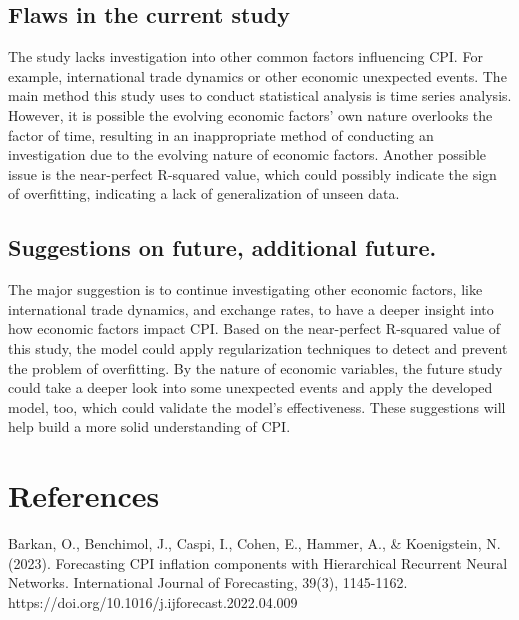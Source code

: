 \documentclass[
  man,floatsintext,
  man]{apa6}
\begin{document}
\hypertarget{flaws-in-the-current-study}{%
\subsection{Flaws in the current study}\label{flaws-in-the-current-study}}

The study lacks investigation into other common factors influencing CPI. For example, international trade dynamics or other economic unexpected events. The main method this study uses to conduct statistical analysis is time series analysis. However, it is possible the evolving economic factors' own nature overlooks the factor of time, resulting in an inappropriate method of conducting an investigation due to the evolving nature of economic factors. Another possible issue is the near-perfect R-squared value, which could possibly indicate the sign of overfitting, indicating a lack of generalization of unseen data.

\hypertarget{suggestions-on-future-additional-future.}{%
\subsection{Suggestions on future, additional future.}\label{suggestions-on-future-additional-future.}}

The major suggestion is to continue investigating other economic factors, like international trade dynamics, and exchange rates, to have a deeper insight into how economic factors impact CPI. Based on the near-perfect R-squared value of this study, the model could apply regularization techniques to detect and prevent the problem of overfitting. By the nature of economic variables, the future study could take a deeper look into some unexpected events and apply the developed model, too, which could validate the model's effectiveness. These suggestions will help build a more solid understanding of CPI.

\newpage

\hypertarget{references}{%
\section{References}\label{references}}

\begin{hangparas}{4em}{1}
\noindent Barkan, O., Benchimol, J., Caspi, I., Cohen, E., Hammer, A., \& Koenigstein, N. (2023). Forecasting CPI inflation components with Hierarchical Recurrent Neural Networks. International Journal of Forecasting, 39(3), 1145-1162. https://doi.org/10.1016/j.ijforecast.2022.04.009 \newline
\end{hangparas}
\end{document}
